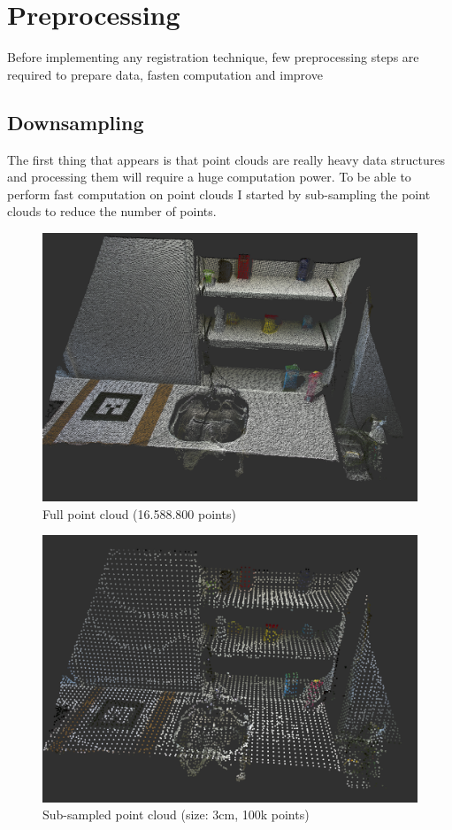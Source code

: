 \section{Preprocessing}

Before implementing any registration technique, few preprocessing steps are required to prepare data, fasten computation and improve 

\subsection{Downsampling}

The first thing that appears is that point clouds are really heavy data structures and processing them will require a huge computation power. To be able to perform fast computation on point clouds I started by sub-sampling the point clouds to reduce the number of points.

\begin{figure}[h!]
\centering
\includegraphics[width=\textwidth]{images/fullpc.png}
\caption{Full point cloud (16.588.800 points)}
\label{fig:fullpc}
\end{figure}

\begin{figure}[h!]
\centering
\includegraphics[width=\textwidth]{images/subsampled.png}
\caption{Sub-sampled point cloud (size: 3cm, 100k points)}
\label{fig:subpc}
\end{figure}

